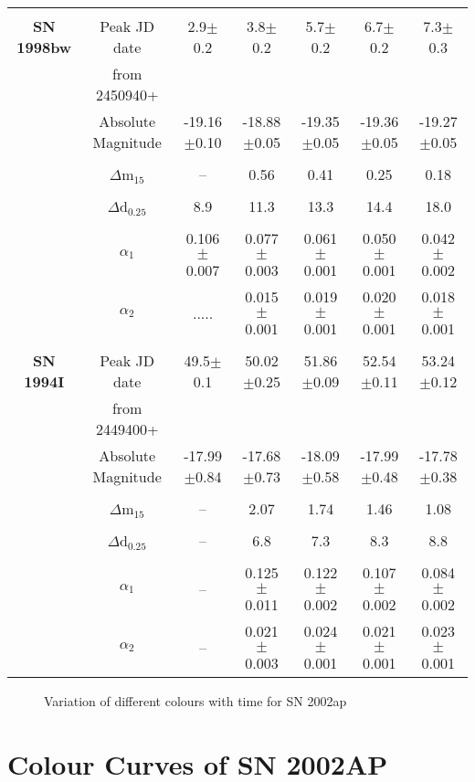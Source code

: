 \begin{table*}
\begin{center}
\begin{tabular}{ccccccc}
            &&&&&&\\
{\bf SN 1998bw}&Peak JD date& 2.9$\pm$0.2& 3.8$\pm$0.2& 5.7$\pm$0.2& 6.7$\pm$0.2&7.3$\pm$0.3 \\
&from 2450940+&&&&&\\
&Absolute Magnitude&-19.16$\pm$0.10&-18.88$\pm$0.05&-19.35$\pm$0.05&-19.36$\pm$0.05&-19.27$\pm$0.05\\
       &&&&&&\\
&$\Delta$m$_{15}$ &--&0.56&0.41&0.25&0.18 \\
            &&&&&&\\
&$\Delta$d$_{0.25}$&8.9&11.3&13.3&14.4&18.0 \\
            &&&&&&\\
&$\alpha_1$&0.106$\pm$0.007&0.077$\pm$0.003&0.061$\pm$0.001&0.050$\pm$0.001&0.042$\pm$0.002 \\
&$\alpha_2$&.....&0.015$\pm$0.001&0.019$\pm$0.001&0.020$\pm$0.001&0.018$\pm$0.001 \\

            &&&&&&\\
{\bf SN 1994I}&Peak JD date&49.5$\pm$0.1& 50.02$\pm$0.25&51.86$\pm$0.09&52.54$\pm$0.11&53.24$\pm$0.12\\
        &from 2449400+&&&&&\\
&Absolute Magnitude&-17.99$\pm$0.84&-17.68$\pm$0.73&-18.09$\pm$0.58&-17.99$\pm$0.48&-17.78$\pm$0.38\\
       &&&&&&\\
&$\Delta$m$_{15}$ &--&2.07&1.74&1.46&1.08 \\
            &&&&&&\\
&$\Delta$d$_{0.25}$ &--&6.8&7.3&8.3&8.8 \\
            &&&&&&\\
&$\alpha_1$&--&0.125$\pm$0.011&0.122$\pm$0.002&0.107$\pm$0.002&0.084$\pm$0.002 \\
&$\alpha_2$&--&0.021$\pm$0.003&0.024$\pm$0.001&0.021$\pm$0.001&0.023$\pm$0.001 \\
    
\hline
\end{tabular}
\end{center}
\end{table*}

\begin{figure}
\caption{Variation of different colours with time for SN 2002ap}
\end{figure}

\section{Colour Curves of SN 2002AP}

